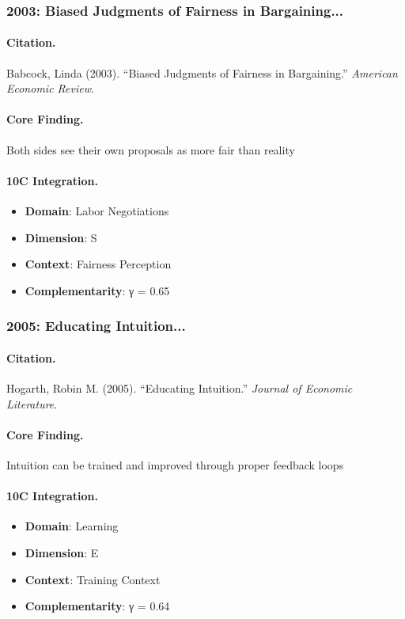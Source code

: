 \subsubsection{2003: Biased Judgments of Fairness in Bargaining...}

\paragraph{Citation.}
Babcock, Linda (2003). ``Biased Judgments of Fairness in Bargaining.''
\textit{American Economic Review}.

\paragraph{Core Finding.}
Both sides see their own proposals as more fair than reality

\paragraph{10C Integration.}
\begin{itemize}[nosep]
  \item \textbf{Domain}: Labor Negotiations
  \item \textbf{Dimension}: S
  \item \textbf{Context}: Fairness Perception
  \item \textbf{Complementarity}: γ = 0.65
\end{itemize}

\subsubsection{2005: Educating Intuition...}

\paragraph{Citation.}
Hogarth, Robin M. (2005). ``Educating Intuition.''
\textit{Journal of Economic Literature}.

\paragraph{Core Finding.}
Intuition can be trained and improved through proper feedback loops

\paragraph{10C Integration.}
\begin{itemize}[nosep]
  \item \textbf{Domain}: Learning
  \item \textbf{Dimension}: E
  \item \textbf{Context}: Training Context
  \item \textbf{Complementarity}: γ = 0.64
\end{itemize}

